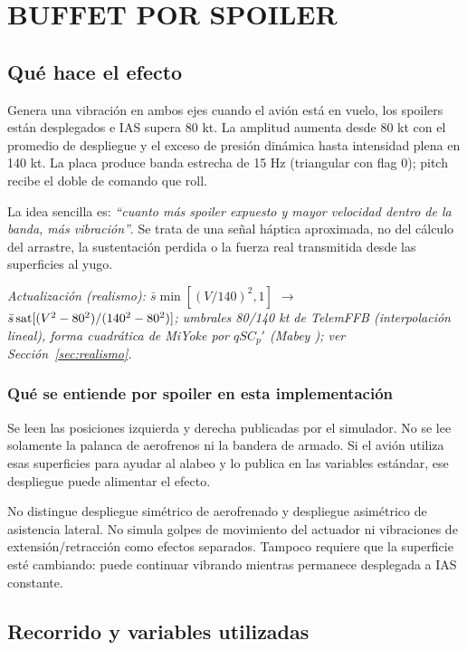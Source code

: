 \section{BUFFET POR SPOILER}
\label{sec:buffet-spoiler}

\subsection{Qué hace el efecto}
Genera una vibración en ambos ejes cuando el avión está en vuelo, los spoilers están desplegados e IAS supera 80 kt. La amplitud aumenta desde 80 kt con el promedio de despliegue y el exceso de presión dinámica hasta intensidad plena en 140 kt. La placa produce banda estrecha de 15 Hz (triangular con flag 0); pitch recibe el doble de comando que roll.

La idea sencilla es: \emph{``cuanto más spoiler expuesto y mayor velocidad dentro de la banda, más vibración''}. Se trata de una señal háptica aproximada, no del cálculo del arrastre, la sustentación perdida o la fuerza real transmitida desde las superficies al yugo.

\textit{Actualización (realismo): $\bar s\min[(V/140)^2,1]$ $\rightarrow$ $\bar s\operatorname{sat}[(V^2-80^2)/(140^2-80^2)]$; umbrales 80/140 kt de TelemFFB (interpolación lineal), forma cuadrática de MiYoke por $qSC_p'$ (Mabey \cite{mabey1988}); ver Sección~\ref{sec:realismo}.}

\subsubsection{Qué se entiende por spoiler en esta implementación}
Se leen las posiciones izquierda y derecha publicadas por el simulador. No se lee solamente la palanca de aerofrenos ni la bandera de armado. Si el avión utiliza esas superficies para ayudar al alabeo y lo publica en las variables estándar, ese despliegue puede alimentar el efecto.

No distingue despliegue simétrico de aerofrenado y despliegue asimétrico de asistencia lateral. No simula golpes de movimiento del actuador ni vibraciones de extensión/retracción como efectos separados. Tampoco requiere que la superficie esté cambiando: puede continuar vibrando mientras permanece desplegada a IAS constante.

\subsection{Recorrido y variables utilizadas}
